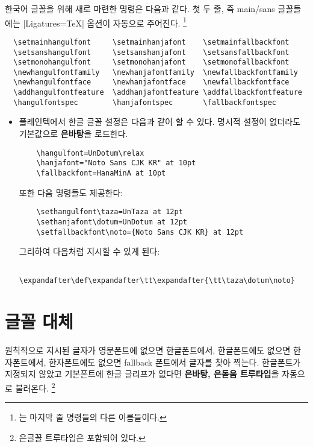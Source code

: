 \documentclass[a4paper]{article}
\def\logoko{\actualtag{ko, phoneme=[ˌkeɪˈəʊ]}{\textsf{k}\kern-.04em $o$}}
\def\luatex{\actualtag{LuaTeX}{\hologo{LuaTeX}}}
\def\luatexko{\luatex-\logoko}
\def\texlive{\TeX\ Live}
\def\hemph#1{\textsf{\bfseries #1}}
\newenvironment{plaintex}{%
  \begin{itemize}\linespread{1.2}\small
    \itemsep0pt plus1pt minus1pt
    \topsep=\itemsep
    \item[\color{gray}plain \TeX]
}{
  \end{itemize}%
}
\begin{document}
한국어 글꼴을 위해 새로 마련한 명령은 다음과 같다.%
\pkgkwd*{\setmainhangulfont}%
\pkgkwd*{\setsanshangulfont}%
\pkgkwd*{\setmonohangulfont}%
\pkgkwd*{\newhangulfontfamily}%
\pkgkwd*{\newhangulfontface}%
\pkgkwd*{\addhangulfontfeature}%
\pkgkwd*{\hangulfontspec}
첫 두 줄, 즉 main/sans 글꼴들에는 |Ligatures=TeX| 옵션이 자동으로 주어진다.%
\footnote{%
    는
  마지막 줄 명령들의 다른 이름들이다. }
\begin{verbatim}
  \setmainhangulfont     \setmainhanjafont    \setmainfallbackfont
  \setsanshangulfont     \setsanshanjafont    \setsansfallbackfont
  \setmonohangulfont     \setmonohanjafont    \setmonofallbackfont
  \newhangulfontfamily   \newhanjafontfamily  \newfallbackfontfamily
  \newhangulfontface     \newhanjafontface    \newfallbackfontface
  \addhangulfontfeature  \addhanjafontfeature \addfallbackfontfeature
  \hangulfontspec        \hanjafontspec       \fallbackfontspec
\end{verbatim}

\begin{plaintex}
  플레인텍에서 한글 글꼴 설정은 다음과 같이 할 수 있다.
  명시적 설정이 없더라도 기본값으로 \hemph{은바탕}을 로드한다.
\begin{verbatim}
    \hangulfont=UnDotum\relax
    \hanjafont="Noto Sans CJK KR" at 10pt
    \fallbackfont=HanaMinA at 10pt
\end{verbatim}

  또한 다음 명령들도 제공한다:
\begin{verbatim}
    \sethangulfont\taza=UnTaza at 12pt
    \sethanjafont\dotum=UnDotum at 12pt
    \setfallbackfont\noto={Noto Sans CJK KR} at 12pt
\end{verbatim}

  그리하여 다음처럼 지시할 수 있게 된다:
\begin{verbatim}
    \expandafter\def\expandafter\tt\expandafter{\tt\taza\dotum\noto}
\end{verbatim}
\end{plaintex}

\section{글꼴 대체}\label{sec:fontswitch}

원칙적으로  지시된 글자가 영문폰트에 없으면 한글폰트에서,
한글폰트에도 없으면 한자폰트에서, 한자폰트에도 없으면 fallback
폰트에서 글자를 찾아 찍는다.
한글폰트가 지정되지 않았고 기본폰트에 한글 글리프가 없다면
\hemph{은바탕, 은돋움 트루타입}을 자동으로 불러온다.%
\footnote{%
  은글꼴 트루타입은  포함되어 있다. }
\end{document}
